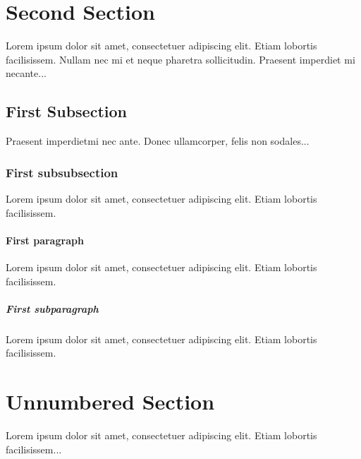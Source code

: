 \documentclass[a4paper, oneside]{book}
\begin{document}


\tableofcontents
\listoffigures
\listoftables
\printglossary
\clearpage

\setcounter{page}{1}



\section{Second Section}

Lorem ipsum dolor sit amet, consectetuer adipiscing elit.  
Etiam lobortis facilisissem.  Nullam nec mi et neque pharetra 
sollicitudin.  Praesent imperdiet mi necante...

\subsection{First Subsection}
Praesent imperdietmi nec ante. Donec ullamcorper, felis non sodales...

\subsubsection{First subsubsection}
Lorem ipsum dolor sit amet, consectetuer adipiscing elit.  
Etiam lobortis facilisissem.
\paragraph{First paragraph}
Lorem ipsum dolor sit amet, consectetuer adipiscing elit.  
Etiam lobortis facilisissem.
\subparagraph{First subparagraph}
Lorem ipsum dolor sit amet, consectetuer adipiscing elit.  
Etiam lobortis facilisissem.

\section*{Unnumbered Section}
Lorem ipsum dolor sit amet, consectetuer adipiscing elit.  
Etiam lobortis facilisissem...
\end{document}
